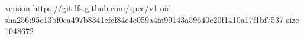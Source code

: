 version https://git-lfs.github.com/spec/v1
oid sha256:95c13bf0ea497b8341efcf84e4e059a4fa99143a59640c20f1410a17f1bf7537
size 1048672
